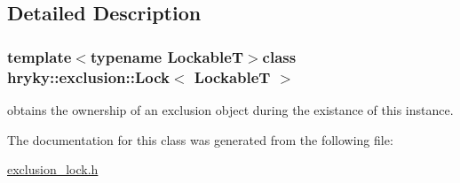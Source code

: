 \subsection{Detailed Description}
\subsubsection*{template$<$typename Lockable\-T$>$class hryky\-::exclusion\-::\-Lock$<$ Lockable\-T $>$}

obtains the ownership of an exclusion object during the existance of this instance. 

The documentation for this class was generated from the following file\-:\begin{DoxyCompactItemize}
\item 
\hyperlink{exclusion__lock_8h}{exclusion\-\_\-lock.\-h}\end{DoxyCompactItemize}
